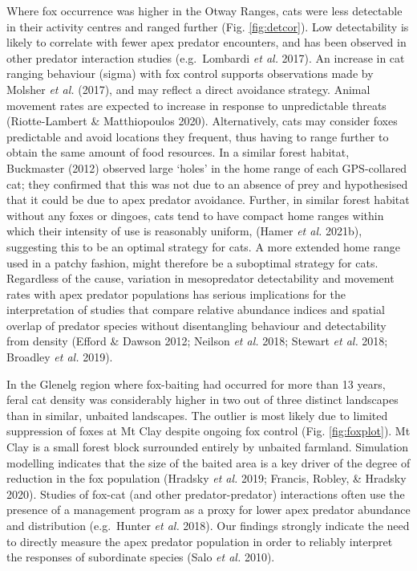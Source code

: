 \documentclass[11pt,a4paper,titlepage,twoside,openright]{style/unimelbthesis}
\begin{document}
\begin{mainmatter}
Where fox occurrence was higher in the Otway Ranges, cats were less detectable in their activity centres and ranged further (Fig. \ref{fig:detcor}). Low detectability is likely to correlate with fewer apex predator encounters, and has been observed in other predator interaction studies (e.g.~Lombardi \emph{et al.} 2017). An increase in cat ranging behaviour (sigma) with fox control supports observations made by Molsher \emph{et al.} (2017), and may reflect a direct avoidance strategy. Animal movement rates are expected to increase in response to unpredictable threats (Riotte-Lambert \& Matthiopoulos 2020). Alternatively, cats may consider foxes predictable and avoid locations they frequent, thus having to range further to obtain the same amount of food resources. In a similar forest habitat, Buckmaster (2012) observed large `holes' in the home range of each GPS-collared cat; they confirmed that this was not due to an absence of prey and hypothesised that it could be due to apex predator avoidance. Further, in similar forest habitat without any foxes or dingoes, cats tend to have compact home ranges within which their intensity of use is reasonably uniform, (Hamer \emph{et al.} 2021b), suggesting this to be an optimal strategy for cats. A more extended home range used in a patchy fashion, might therefore be a suboptimal strategy for cats. Regardless of the cause, variation in mesopredator detectability and movement rates with apex predator populations has serious implications for the interpretation of studies that compare relative abundance indices and spatial overlap of predator species without disentangling behaviour and detectability from density (Efford \& Dawson 2012; Neilson \emph{et al.} 2018; Stewart \emph{et al.} 2018; Broadley \emph{et al.} 2019).

In the Glenelg region where fox-baiting had occurred for more than 13 years, feral cat density was considerably higher in two out of three distinct landscapes than in similar, unbaited landscapes. The outlier is most likely due to limited suppression of foxes at Mt Clay despite ongoing fox control (Fig. \ref{fig:foxplot}). Mt Clay is a small forest block surrounded entirely by unbaited farmland. Simulation modelling indicates that the size of the baited area is a key driver of the degree of reduction in the fox population (Hradsky \emph{et al.} 2019; Francis, Robley, \& Hradsky 2020). Studies of fox-cat (and other predator-predator) interactions often use the presence of a management program as a proxy for lower apex predator abundance and distribution (e.g.~Hunter \emph{et al.} 2018). Our findings strongly indicate the need to directly measure the apex predator population in order to reliably interpret the responses of subordinate species (Salo \emph{et al.} 2010).


\end{mainmatter}
\end{document}
